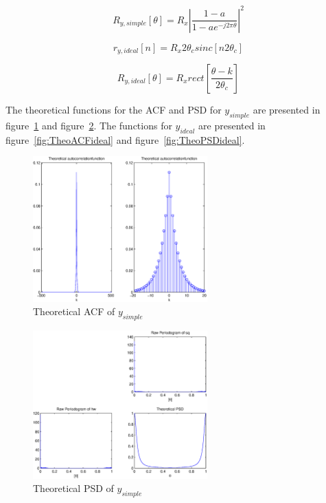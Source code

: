 \documentclass[10pt]{article}
\begin{document}
\begin{equation}
  \label{eq:PSDsimple}
  R_{y,simple}[\theta] =  R_x|\frac{1-a}{1-ae^{-j2\pi\theta}}|^2
\end{equation}

\begin{equation}
  \label{eq:ACFideal}
  r_{y,ideal}[n] = R_x2\theta_csinc[n2\theta_c]
\end{equation}

\begin{equation}
  \label{eq:PSDideal}
  R_{y,ideal}[\theta] = R_xrect[\frac{\theta - k}{2\theta_c}]
\end{equation}


The theoretical functions for the ACF and PSD for $y_{simple}$ are presented
in figure~\ref{fig:TheoACFsimple} and figure~\ref{fig:TheoPSDsimple}.
The functions for $y_{ideal}$ are presented in figure~\ref{fig:TheoACFideal} and
figure~\ref{fig:TheoPSDideal}.



\begin{figure}[!hp]

    \begin{center}
      \includegraphics[width=0.6\textwidth]{TheoACF}
    \caption{Theoretical ACF of $y_{simple}$ \label{fig:TheoACFsimple}}
    \end{center}

\end{figure}

\begin{figure}[!hp]

    \begin{center}
      \includegraphics[width=0.6\textwidth]{TheoPSD}
    \caption{Theoretical PSD of $y_{simple}$ \label{fig:TheoPSDsimple}}
    \end{center}

\end{figure}
\end{document}
